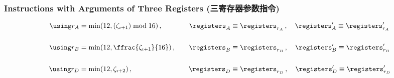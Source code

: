 \subsubsection{Instructions with Arguments of Three Registers (三寄存器参数指令)}
\begin{equation}
\begin{aligned}
  \using r_A &= \min(12, (\instructions_{\imath+1}) \bmod 16) \,,\quad&
  \reg_A &\equiv \reg_{r_A} \,,\quad
  \reg'_A \equiv \reg'_{r_A} \\\\
  \using r_B &= \min(12, \ffrac{\instructions_{\imath+1}}{16}) \,,\quad&
  \reg_B &\equiv \reg_{r_B} \,,\quad
  \reg'_B \equiv \reg'_{r_B} \\\\
  \using r_D &= \min(12, \instructions_{\imath+2}) \,,\quad&
  \reg_D &\equiv \reg_{r_D} \,,\quad
  \reg'_D \equiv \reg'_{r_D} \\\\
\end{aligned}
\end{equation}

